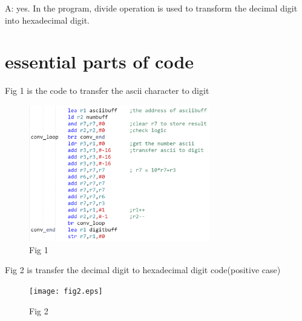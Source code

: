 \documentclass[twoside]{article}
\begin{document}
\begin{CJK*}{UTF8}{gbsn}
\begin{itemize}
				A: yes. In the program, divide operation is used to transform the decimal digit into hexadecimal digit.
	\end{itemize}


	\section{essential parts of code}
	Fig 1 is the code to transfer the ascii character to digit
	\begin{figure}[htbp]
		\small
		\centering
		\includegraphics[width=0.7\textwidth]{fig1.eps}
		\caption{Fig 1} %
	\end{figure}
	
	
	Fig 2 is transfer the decimal digit to hexadecimal digit code(positive case)

	\begin{figure}[htbp]
		\small
		\centering
		\texttt{[image: fig2.eps]}
		\caption{Fig 2} %
	\end{figure}

\end{CJK*}
\end{document}
